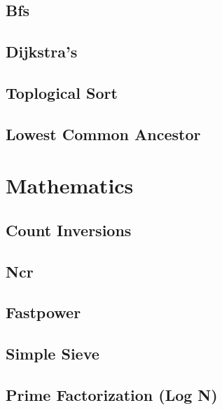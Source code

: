 \subsection{Bfs}
\raggedbottom
\hrulefill
\subsection{Dijkstra's}
\raggedbottom
\hrulefill
\subsection{Toplogical Sort}
\raggedbottom
\hrulefill
\subsection{Lowest Common Ancestor}
\raggedbottom
\hrulefill
\raggedbottom
\hrulefill

\section{Mathematics}
\subsection{Count Inversions}
\raggedbottom
\hrulefill
\subsection{Ncr}
\raggedbottom
\hrulefill
\subsection{Fastpower}
\raggedbottom
\hrulefill
\subsection{Simple Sieve}
\raggedbottom
\hrulefill
\subsection{Prime Factorization (Log N)}
\raggedbottom
\hrulefill
